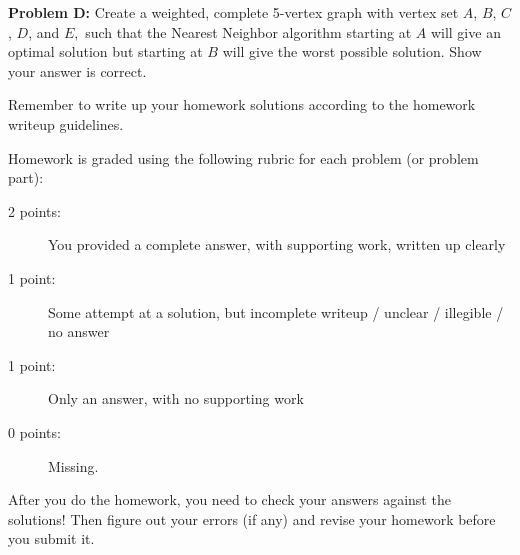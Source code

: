 \documentclass[11pt, oneside]{article}   	%
\begin{document}
\textbf{Problem D:} Create a weighted, complete 5-vertex graph with
vertex set $A$, $B$, $C$, $D$, and $E,$ such that the Nearest Neighbor
algorithm starting at $A$ will give an optimal solution but starting
at $B$ will give the worst possible solution. Show your answer is
correct. \\


\hrulefill

\vfill

Remember to write up your homework solutions according to the homework writeup guidelines. 

Homework is graded using the following rubric for each problem (or problem part):

\begin{description}
\item[2 points:] You provided a complete answer, with supporting work, written up clearly
\item[1 point:] Some attempt at a solution, but incomplete writeup / unclear / illegible / no answer
\item[1 point:] Only an answer, with no supporting work 
\item[0 points:] Missing.
\end{description}

After you do the homework, you need to check your answers against the solutions! Then figure out your errors (if any) and revise your homework before you submit it. 
\end{document}
